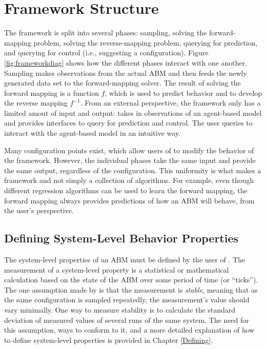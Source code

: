 \section{Framework Structure}

The framework is split into several phases: sampling, solving the forward-mapping problem, solving the reverse-mapping problem, querying for prediction, and querying for control (i.e., suggesting a configuration).
Figure \ref{fig:frameworkdiag} shows how the different phases interact with one another.
Sampling makes observations from the actual ABM and then feeds the newly generated data set to the forward-mapping solver.
The result of solving the forward mapping is a function $f$, which is used to predict behavior and to develop the reverse mapping $f^{-1}$.
From an external perspective, the framework only has a limited amout of input and output:
\fw takes in observations of an agent-based model and provides interfaces to query for prediction and control.
The user queries \fw to interact with the agent-based model in an intuitive way.


Many configuration points exist, which allow users of \fw to modify the behavior of the framework.
However, the individual phases take the same input and provide the same output, regardless of the configuration.
This uniformity is what makes \fw a framework and not simply a collection of algorithms.
For example, even though different regression algorithms can be used to learn the forward mapping, the forward mapping always provides predictions of how an ABM will behave, from the user's perspective.








\subsection{Defining System-Level Behavior Properties}
The system-level properties of an ABM must be defined by the user of \fw.
The measurement of a system-level property is a statistical or mathematical calculation based on the state of the ABM over some period of time (or ``ticks'').
The one assumption made by \fw is that the measurement is \textit{stable}, meaning that as the same configuration is sampled repeatedly, the measurement's value should vary minimally.
One way to measure stability is to calculate the standard deviation of measured values of several runs of the same system.
The need for this assumption, ways to conform to it, and a more detailed explanation of how to define system-level properties is provided in Chapter \ref{Defining}.

